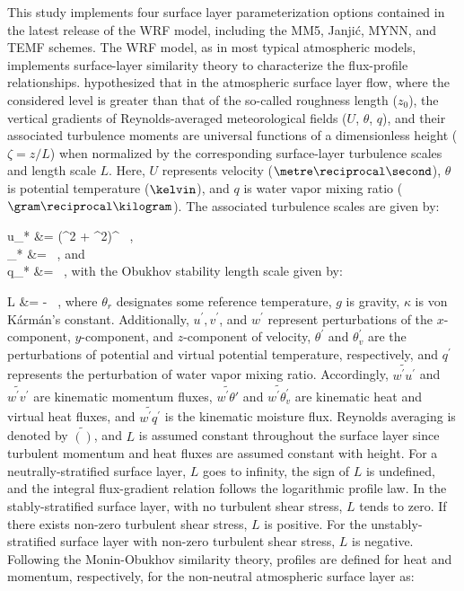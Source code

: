 This study implements four surface layer parameterization options contained in the latest release of the WRF model, including the MM5, Janji\'{c}, MYNN, and TEMF schemes. The WRF model, as in most typical atmospheric models, implements surface-layer similarity theory to characterize the flux-profile relationships.  \citet{MO} hypothesized that in the atmospheric surface layer flow, where the considered level is greater than that of the so-called roughness length ($z_0$), the vertical gradients of Reynolds-averaged meteorological fields ($U$, $\theta$, $q$), and their associated turbulence moments are universal functions of a dimensionless height ($\zeta=z/L$) when normalized by the corresponding surface-layer turbulence scales and length scale $L$. Here, $U$ represents velocity ($\metre\reciprocal\second$), $\theta$ is potential temperature ($\kelvin$), and $q$ is water vapor mixing ratio ($\gram\reciprocal\kilogram$). The associated turbulence scales are given by:


\bse \label{equation315}
\bal
u_* &= (^2 + ^2)^{} \, , \label{equation315a} \\
\theta_* &=  \, , \quad and \label{equation315b}\\
q_* &=  \, , \label{equation315c}
\eal
\ese
\noindent
 with the Obukhov stability length scale given by:

\bse \label{equation316}
\bal
L &= - \, , 
\eal
\ese
\noindent
where $\theta_r$ designates some reference temperature, $g$ is gravity, $\kappa$ is von K\'{a}rm\'{a}n's constant. Additionally, $u^{'},v^{'}$, and $w^{'}$ represent perturbations of the $x$-component, $y$-component, and $z$-component of velocity, $\theta^{'}$ and $\theta_v^{'}$ are the perturbations of potential and virtual potential temperature, respectively, and $q^{'}$ represents the perturbation of water vapor mixing ratio. Accordingly, $\widetilde{w^{'}u^{'}}$ and $\widetilde{w^{'}v^{'}}$ are kinematic momentum fluxes, $\widetilde{w^{'}\theta{'}}$ and $\widetilde{w^{'}\theta_v^{'}}$ are kinematic heat and virtual heat fluxes, and $\widetilde{w^{'}q^{'}}$ is the kinematic moisture flux. Reynolds averaging is denoted by $\widetilde{()}$, and $L$ is assumed constant throughout the surface layer since turbulent momentum and heat fluxes are assumed constant with height. For a neutrally-stratified surface layer, $L$ goes to infinity, the sign of $L$ is undefined, and the integral flux-gradient relation follows the logarithmic profile law. In the stably-stratified surface layer, with no turbulent shear stress, $L$ tends to zero. If there exists non-zero turbulent shear stress, $L$ is positive. For the unstably-stratified surface layer with non-zero turbulent shear stress, $L$ is negative. Following the Monin-Obukhov similarity theory, profiles are defined for heat and momentum, respectively, for the non-neutral atmospheric surface layer as:
 
